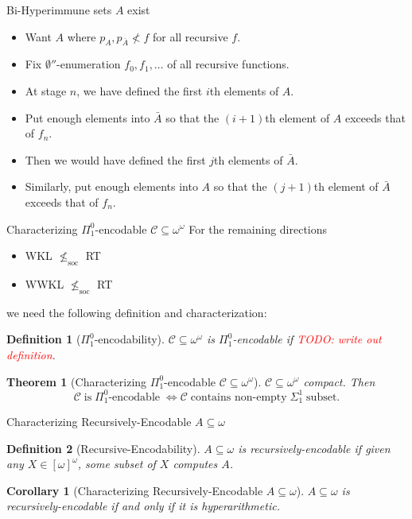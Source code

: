 \documentclass[notes]{beamer}
\newcommand{\TODO}[1]{\textcolor{red}{TODO: #1}}
\newtheorem{thm}{Theorem}
\newtheorem{coro}{Corollary}
\newtheorem{define}{Definition}
\begin{document}
\begin{frame}{Bi-Hyperimmune sets $A$ exist}
  \begin{itemize}
    \item Want $A$ where $p_A,p_{\bar{A}}\not<f$ for all recursive $f$.
    \item Fix $\emptyset''$-enumeration $f_0,f_1,\ldots$ of all recursive
      functions.
    \item At stage $n$, we have defined the first $i$th elements of $A$.
    \item Put enough elements into $\bar{A}$ so that the $(i+1)$th element
      of $A$ exceeds that of $f_n$.
    \item Then we would have defined the first $j$th elements of $\bar{A}$.
    \item Similarly, put enough elements into $A$ so that the $(j+1)$th
      element of $\bar{A}$ exceeds that of $f_n$.
  \end{itemize}
\end{frame}

\begin{frame}{Characterizing $\Pi_1^0$-encodable
$\mathcal{C}\subseteq\omega^\omega$}
  For the remaining directions
  \begin{itemize}
    \item WKL $\nleq_{\text{soc}}$ RT
    \item WWKL $\nleq_{\text{soc}}$ RT
  \end{itemize}

  we need the following definition and characterization:
  \begin{define}[$\Pi_1^0$-encodability]
    $\mathcal{C}\subseteq \omega^{\omega}$ is $\Pi_1^0$-encodable if
    \TODO{write out definition}.
  \end{define}

  \begin{thm}[Characterizing $\Pi_1^0$-encodable
  $\mathcal{C}\subseteq\omega^\omega$]
    $\mathcal{C}\subseteq \omega^{\omega}$ compact. Then
    \[\mathcal{C}\; \text{is}\; \Pi_1^0\text{-encodable}\; \Leftrightarrow
    \mathcal{C}\; \text{contains non-empty}\; \Sigma_1^1\; \text{subset}.\]
  \end{thm}
\end{frame}

\begin{frame}{Characterizing Recursively-Encodable $A\subseteq\omega$}
  \begin{define}[Recursive-Encodability]
    $A\subseteq\omega$ is recursively-encodable if given any
    $X\in[\omega]^\omega$, some subset of $X$ computes $A$.
  \end{define}

  \begin{coro}[Characterizing Recursively-Encodable $A\subseteq\omega$]
    $A\subseteq\omega$ is recursively-encodable if and only if it is
    hyperarithmetic.
  \end{coro}
\end{frame}
\end{document}
